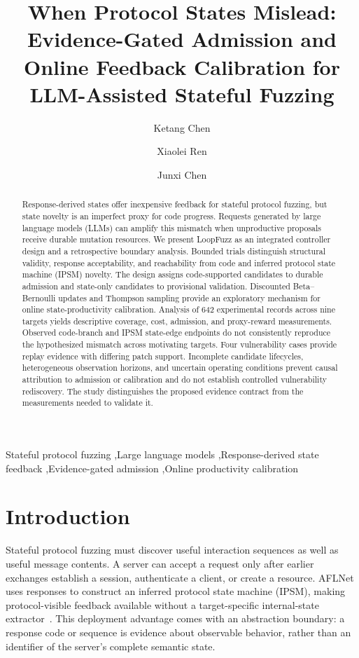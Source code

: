 \documentclass[final,5p,times,number]{elsarticle}
\begin{document}
\raggedbottom
\begin{frontmatter}
\title{When Protocol States Mislead: Evidence-Gated Admission and Online Feedback Calibration for LLM-Assisted Stateful Fuzzing}
\author[inst1]{Ketang Chen}
\author[inst1]{Xiaolei Ren}
\author[inst1]{Junxi Chen}
\begin{abstract}
Response-derived states offer inexpensive feedback for stateful protocol fuzzing, but state novelty is an imperfect proxy for code progress. Requests generated by large language models (LLMs) can amplify this mismatch when unproductive proposals receive durable mutation resources. We present LoopFuzz as an integrated controller design and a retrospective boundary analysis. Bounded trials distinguish structural validity, response acceptability, and reachability from code and inferred protocol state machine (IPSM) novelty. The design assigns code-supported candidates to durable admission and state-only candidates to provisional validation. Discounted Beta--Bernoulli updates and Thompson sampling provide an exploratory mechanism for online state-productivity calibration. Analysis of 642 experimental records across nine targets yields descriptive coverage, cost, admission, and proxy-reward measurements. Observed code-branch and IPSM state-edge endpoints do not consistently reproduce the hypothesized mismatch across motivating targets. Four vulnerability cases provide replay evidence with differing patch support. Incomplete candidate lifecycles, heterogeneous observation horizons, and uncertain operating conditions prevent causal attribution to admission or calibration and do not establish controlled vulnerability rediscovery. The study distinguishes the proposed evidence contract from the measurements needed to validate it.
\end{abstract}
\begin{keyword}
Stateful protocol fuzzing \sep Large language models \sep Response-derived state feedback \sep Evidence-gated admission \sep Online productivity calibration
\end{keyword}
\end{frontmatter}

\section{Introduction}
Stateful protocol fuzzing must discover useful interaction sequences as well as useful message contents. A server can accept a request only after earlier exchanges establish a session, authenticate a client, or create a resource. AFLNet uses responses to construct an inferred protocol state machine (IPSM), making protocol-visible feedback available without a target-specific internal-state extractor~\cite{aflnet}. This deployment advantage comes with an abstraction boundary: a response code or sequence is evidence about observable behavior, rather than an identifier of the server's complete semantic state.
\end{document}
